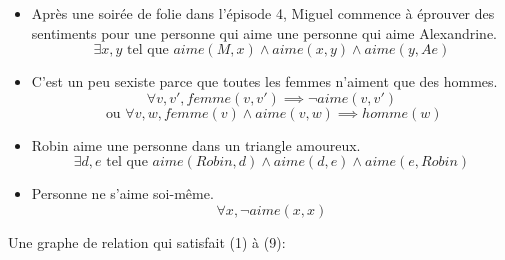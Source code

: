 \documentclass{article}
\begin{document}
\begin{itemize}
        \item {} Après une soirée de folie dans l’épisode 4, Miguel commence à éprouver des sentiments pour une personne qui aime une personne qui aime Alexandrine.
            \begin{equation}
            \exists x, y \text{ tel que } aime(M, x) \land aime(x, y) \land aime(y, Ae)
            \end{equation}
        \item C’est un peu sexiste parce que toutes les femmes n’aiment que des hommes.
            \begin{equation}
            \forall v, v', femme(v, v') \implies \neg aime(v, v')
            \end{equation}
            \begin{equation}
            \text{ ou } \forall v, w, femme(v) \land aime(v, w) \implies homme(w)
            \end{equation}
        \item Robin aime une personne dans un triangle amoureux.
            \begin{equation}
            \exists d, e \text{ tel que } aime(Robin, d) \land aime(d, e) \land aime(e, Robin)
            \end{equation}
        \item Personne ne s’aime soi-même.
            \begin{equation}
            \forall x, \neg aime(x, x)
            \end{equation}
    \end{itemize}
    Une graphe de relation qui satisfait (1) à (9):
\end{document}
